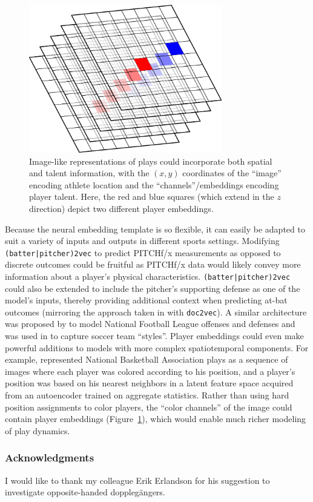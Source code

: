\documentclass{article}
\begin{document}
\begin{figure}[h]
\centering
\includegraphics[width=0.75\textwidth,height=\textheight,keepaspectratio]{image_embedding.png}
\caption{Image-like representations of plays could incorporate both spatial and talent information, with the $(x, y)$ coordinates of the ``image'' encoding athlete location and the ``channels''/embeddings encoding player talent. Here, the red and blue squares (which extend in the $z$ direction) depict two different player embeddings.}
\label{fig:image_embed}
\end{figure}

Because the neural embedding template is so flexible, it can easily be adapted to suit a variety of inputs and outputs in different sports settings. Modifying \texttt{(batter|pitcher)2vec} to predict PITCHf/x measurements as opposed to discrete outcomes could be fruitful as PITCHf/x data would likely convey more information about a player's physical characteristics. \texttt{(batter|pitcher)2vec} could also be extended to include the pitcher's supporting defense as one of the model's inputs, thereby providing additional context when predicting at-bat outcomes (mirroring the approach taken in \parencite{Le2014} with \texttt{doc2vec}). A similar architecture was proposed by \parencite{Alcorn2016} to model National Football League offenses and defenses and was used in \parencite{Le2017} to capture soccer team ``styles''. Player embeddings could even make powerful additions to models with more complex spatiotemporal components. For example, \parencite{Wang2016} represented National Basketball Association plays as a sequence of images where each player was colored according to his position, and a player's position was based on his nearest neighbors in a latent feature space acquired from an autoencoder trained on aggregate statistics. Rather than using hard position assignments to color players, the ``color channels'' of the image could contain player embeddings (Figure~\ref{fig:image_embed}), which would enable much richer modeling of play dynamics.

\subsubsection*{Acknowledgments}

I would like to thank my colleague Erik Erlandson for his suggestion to investigate opposite-handed dopplegängers.

\printbibliography
\end{document}
